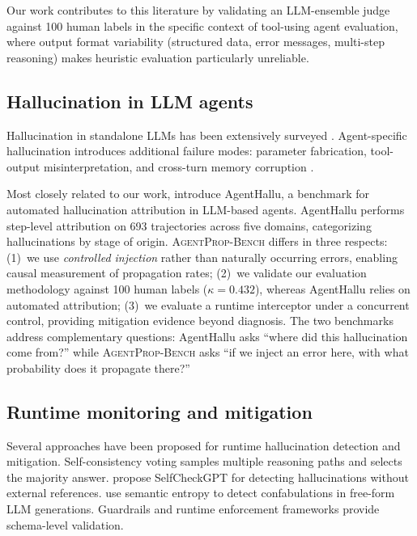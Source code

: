 \documentclass[preprint,review,12pt,3p]{elsarticle}
\newcommand{\bench}{\textsc{AgentProp-Bench}\xspace}
\begin{document}
Our work contributes to this literature by validating an LLM-ensemble
judge against 100 human labels in the specific context of tool-using
agent evaluation, where output format variability (structured data,
error messages, multi-step reasoning) makes heuristic evaluation
particularly unreliable.

\subsection{Hallucination in LLM agents}

Hallucination in standalone LLMs has been extensively surveyed
\citep{huang2024hallucination,lin2025agenthallusurvey}.
Agent-specific hallucination introduces additional failure modes:
parameter fabrication, tool-output misinterpretation, and cross-turn
memory corruption \citep{zhang2025memory}.

Most closely related to our work, \citet{liu2026agenthallu} introduce
AgentHallu, a benchmark for automated hallucination attribution in
LLM-based agents.
AgentHallu performs step-level attribution on 693 trajectories across
five domains, categorizing hallucinations by stage of origin.
\bench{} differs in three respects:
(1)~we use \emph{controlled injection} rather than naturally occurring
errors, enabling causal measurement of propagation rates;
(2)~we validate our evaluation methodology against 100 human labels
($\kappa{=}0.432$), whereas AgentHallu relies on automated attribution;
(3)~we evaluate a runtime interceptor under a concurrent control,
providing mitigation evidence beyond diagnosis.
The two benchmarks address complementary questions: AgentHallu asks
``where did this hallucination come from?'' while \bench{} asks
``if we inject an error here, with what probability does it propagate
there?''

\subsection{Runtime monitoring and mitigation}

Several approaches have been proposed for runtime hallucination
detection and mitigation.
Self-consistency voting \citep{wang2023selfconsistency} samples multiple
reasoning paths and selects the majority answer.
\citet{manakul2023selfcheckgpt} propose SelfCheckGPT for detecting
hallucinations without external references.
\citet{farquhar2024semantic} use semantic entropy to detect
confabulations in free-form LLM generations.
Guardrails and runtime enforcement frameworks
\citep{wang2026agentspec} provide schema-level validation.
\end{document}
